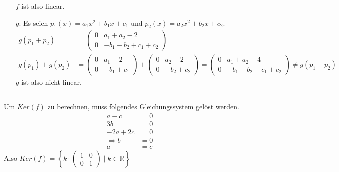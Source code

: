 \documentclass{../mfa}
\begin{document}
\begin{itemize}
$f$ ist also linear.
\item[$g$:] Es seien $p_1(x) = a_1x^2 + b_1x + c_1$ und $p_2(x) = a_2x^2 + b_2x
   + c_2$.
   \begin{align*}
      g(p_1 + p_2) &= \begin{pmatrix}
      0 & a_1 + a_2 - 2 \\
      0 & -b_1 -b_2 + c_1 + c_2
   \end{pmatrix} \\
   g(p_1) + g(p_2) &= \begin{pmatrix}
   0 & a_1 - 2 \\
   0 & -b_1 + c_1
\end{pmatrix} + \begin{pmatrix}
   0 & a_2 - 2 \\
   0 & -b_2 + c_2
\end{pmatrix} = \begin{pmatrix}
   0 & a_1 + a_2 - 4 \\
   0 & -b_1 -b_2 + c_1 + c_2
\end{pmatrix} \neq g(p_1 + p_2)
   \end{align*}
   $g$ ist also nicht linear.
\end{itemize}

\subsection{}
Um $Ker(f)$ zu berechnen, muss folgendes Gleichungssystem gelöst werden.
\begin{align*}
   a - c    & = 0 \\
   3b       & = 0 \\
   -2a + 2c & = 0 \\
   \Rightarrow b &= 0 \\
   a &= c
\end{align*}
Also $Ker(f) = \left\{k \cdot \begin{pmatrix} 1 & 0 \\ 0 & 1 \end{pmatrix} \mid k \in \mathbb{R} \right\}$

\subsection{}
\end{document}
